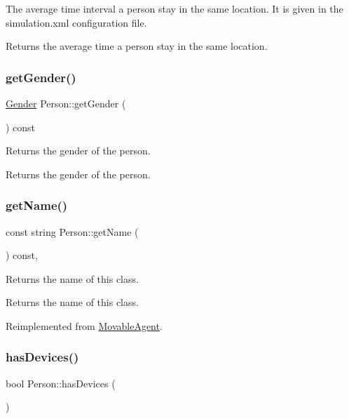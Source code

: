 The average time interval a person stay in the same location. It is given in the simulation.\+xml configuration file. \begin{DoxyReturn}{Returns}
the average time a person stay in the same location. 
\end{DoxyReturn}
\mbox{\label{class_person_adb5a4fabaaa6bf851de701aeb9df4fdf}} 
\subsubsection{\texorpdfstring{getGender()}{getGender()}}
{\footnotesize\ttfamily \mbox{\hyperlink{class_person_aff84ca16bd4dbf364614d86f20b29dd2}{Gender}} Person\+::get\+Gender (\begin{DoxyParamCaption}{ }\end{DoxyParamCaption}) const}

Returns the gender of the person. \begin{DoxyReturn}{Returns}
the gender of the person. 
\end{DoxyReturn}
\mbox{\label{class_person_aa2a6f8d7f1d94045a03ca578f2ed272c}} 
\subsubsection{\texorpdfstring{getName()}{getName()}}
{\footnotesize\ttfamily const string Person\+::get\+Name (\begin{DoxyParamCaption}{ }\end{DoxyParamCaption}) const\hspace{0.3cm}{\ttfamily [override]}, {\ttfamily [virtual]}}

Returns the name of this class. \begin{DoxyReturn}{Returns}
the name of this class. 
\end{DoxyReturn}


Reimplemented from \mbox{\hyperlink{class_movable_agent_abcc1218876c39c996f2cb1eba2b96379}{Movable\+Agent}}.

\mbox{\label{class_person_a40d6f2c716dd3c9794067817a3fb9165}} 
\subsubsection{\texorpdfstring{hasDevices()}{hasDevices()}}
{\footnotesize\ttfamily bool Person\+::has\+Devices (\begin{DoxyParamCaption}{ }\end{DoxyParamCaption})}

